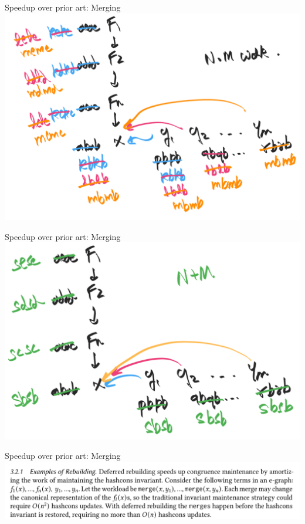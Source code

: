 \documentclass[8pt]{beamer}
\begin{document}
\begin{frame}[fragile]{Speedup over prior art: Merging}
\includegraphics[width=\textwidth]{./eg-2-4.png}
\end{frame}


\begin{frame}[fragile]{Speedup over prior art: Merging}
\includegraphics[width=\textwidth]{./eg-2-5.png}
\end{frame}



\begin{frame}[fragile]{Speedup over prior art: Merging}
\includegraphics[width=\textwidth]{./eg-2-paper-snippet.png}
\end{frame}
\end{document}
